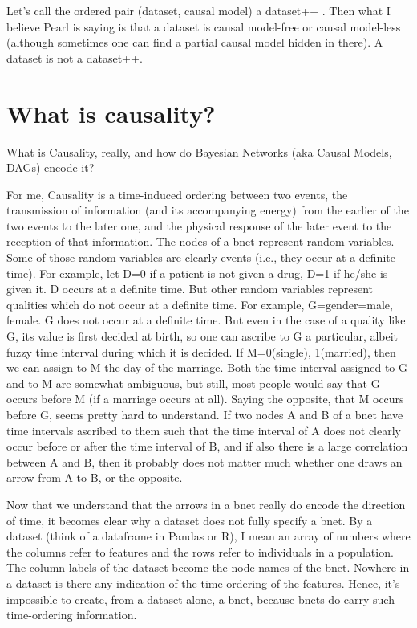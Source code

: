 Let’s call the ordered pair
(dataset, causal model) a
dataset++ . Then what I
believe Pearl is saying is that a
dataset is causal model-free or causal model-less
(although sometimes one can find a partial
causal model hidden in there). A dataset
is not a dataset++.

\section{What is causality?}
What is Causality, really, and how do Bayesian Networks
(aka Causal Models,
DAGs) encode it?

For me, Causality is a time-induced ordering between two events, the
transmission of information (and its accompanying
energy) from the earlier of the two events to the later
one, and the physical response of the later event to the reception of that
information. The nodes of a bnet represent random variables. Some of those
random variables are clearly events (i.e., they occur at a definite time).
For example, let D=0 if a patient is not given a drug, D=1 if he/she is given
it. D occurs at a definite time. But other random variables represent
qualities which do not occur at a definite time. For example,
G=gender=male, female. G does not occur at a definite time.  But even in the
case of a quality like G, its value is first decided at birth, so one can
ascribe to G a particular, albeit fuzzy time interval during which it is
decided. If M=0(single), 1(married), then we can assign to M the day of the
marriage. Both the time interval assigned to G and to  M are somewhat
ambiguous, but still, most people would say that G occurs before M (if a
marriage occurs at all). Saying the opposite, that M occurs before G, seems
pretty hard to understand. If two nodes A and B of a bnet have time intervals
ascribed to them such that the time interval of A does not clearly occur
before or after the time interval of B, and if also there is a large
correlation between A and B, then it probably does not matter
much whether one draws an arrow from A to B, or the opposite.

Now that we understand that the arrows in a bnet really do encode the
direction of time, it becomes clear why a dataset does not fully specify a
bnet. By a dataset (think of a dataframe in Pandas or R), I mean an array of
numbers where the columns refer to features and the rows refer to individuals
in a population. The column labels of the dataset become the node names of
the bnet. Nowhere in a dataset is there any indication of the time ordering
of the features. Hence, it’s impossible to create, from a dataset alone, a
bnet, because bnets do carry such time-ordering information.

